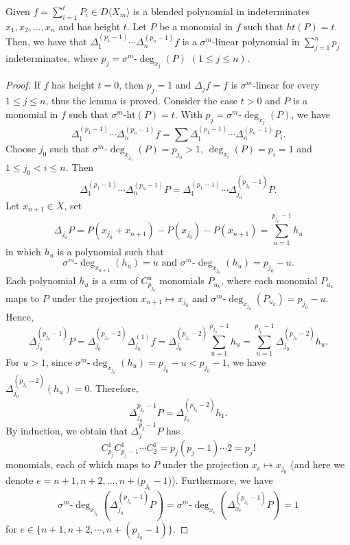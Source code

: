 \documentclass[10pt,a4paper]{amsart}
\begin{document}
\begin{lemma} Given $f = \sum_{i=1}^\ell P_i \in D\langle X_m \rangle$ is a blended polynomial in indeterminates $x_1, x_2, \dots, x_n$ and has height $t$. Let $P$ be a monomial in $f$ such that $ht(P) = t$. Then, we have that $\Delta_1^{(p_1-1)}\cdots\Delta_n^{(p_n-1)}f$ is a $\sigma^m$-linear polynomial in $\sum_{j=1}^n p_j$ indeterminates, where $p_j = \sigma^m\text{-}\deg_{x_j}(P)$ $(1 \leq j \leq n)$.
\end{lemma}

\begin{proof}
	If $f$ has height $t=0$, then $p_j=1$ and $\Delta_jf=f$ is $\sigma^m$-linear for every $1\leq j\leq n$, thus the lemma is proved. Consider the case $t>0$ and $P$ is a monomial in $f$ such that $\sigma^m\text{-ht}(P)=t$. With $p_j=\sigma^m\text{-}\deg_{x_j}(P)$, we have
	\[
	\Delta_1^{(p_1-1)}\cdots\Delta_n^{(p_n-1)}f=\sum\Delta_1^{(p_1-1)}\cdots\Delta_n^{(p_n-1)}P_i.
	\]
	Choose $j_0$ such that $\sigma^m\text{-}\deg_{x_{j_0}}(P)=p_{j_0}>1$, $\deg_{x_i}(P)=p_i=1$ and $1\leq j_0<i\leq n$. Then
	\[
	\Delta_1^{(p_1-1)}\cdots\Delta_n^{(p_n-1)}P=\Delta_1^{(p_1-1)}\cdots\Delta_{j_0}^{(p_{j_0}-1)}P.
	\]
	Let $x_{n+1}\in X$, set
	\[
	\Delta_{j_0}P=P(x_{j_0}+x_{n+1})-P(x_{j_0})-P(x_{n+1})=\sum_{u=1}^{p_{j_0}-1}h_u
	\]
	in which $h_u$ is a polynomial such that 			$$\sigma^m\text{-}\deg_{x_{n+1}}(h_u)=u\text{ and } \sigma^m\text{-}\deg_{x_{j_0}}(h_u)=p_{j_{0}}-u.$$
	Each polynomial $h_u$ is a sum of $C_{p_{j_0}}^u$ monomials $P_{u_k}$, where each monomial $P_{u_k}$ maps to $P$ under the projection $x_{n+1}\mapsto x_{j_0}$ and $\sigma^m\text{-}\deg_{x_{j_0}}(P_{u_k})=p_{j_0}-u$.
	Hence,
	\[
	\Delta_{j_0}^{(p_{j_0}-1)}P=\Delta_{j_0}^{(p_{j_0}-2)}\Delta_{j_0}^{(1)}f=\Delta_{j_0}^{(p_{j_0}-2)}\sum_{u=1}^{p_{j_0}-1}h_u=\sum_{u=1}^{p_{j_0}-1}\Delta_{j_0}^{(p_{j_0}-2)}h_u.
	\]
	For $u>1$, since $\sigma^m$-$\deg_{x_{j_0}} (h_u) =p_{j_0}-u<p_{j_0}-1$, we have $\Delta_{{{j_0}}}^{(p_{j_0}-2)}(h_u)=0$. Therefore,
	\[
	\Delta_{{j_0}}^{p_{j_0}-1} P=\Delta^{(p_{j_0}-2)}_{{j_0}}h_1.
	\]
	By induction, we obtain that  $\Delta_{j}^{p_j-1}P$ has
	\[
	C^1_{p_j}C^1_{p_j-1}\cdots C^1_2= p_j(p_j-1)\cdots 2=p_j!
	\]
	monomials, each of which maps to $P$ under the projection $x_{e}\mapsto x_{j_0}$ (and here we denote $e=n+1, n+2, \dots, n+(p_{j_0}-1$)). Furthermore, we have 
	\[
	\sigma^m\text{-}\deg_{x_{j_0}}( \Delta_{j_0}^{(p_{j_0}-1)}P)=\sigma^m\text{-}\deg_{x_{e}} (\Delta_{x_{e}}^{(p_{j_0}-1)}P)=1
	\]
	for $e\in\{n+1, n+2, \cdots, n+(p_{j_0}-1)\}$. 
	

\end{proof}
\end{document}
